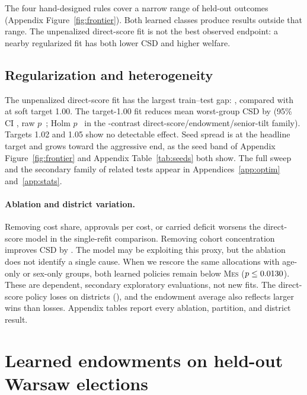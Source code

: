 \documentclass{article}
\newcommand{\MES}{\textsc{Mes}}
\begin{document}
The four hand-designed rules cover a narrow range of held-out outcomes
(Appendix Figure~\ref{fig:frontier}). Both learned classes produce results
outside that range. The unpenalized direct-score fit is not the best observed
endpoint: a nearby regularized fit has both lower CSD and higher welfare.



\subsection{Regularization and heterogeneity}

The unpenalized direct-score fit has the largest train--test gap:
\LearnedCornerGap{}, compared with \LearnedHeadGap{} at soft target 1.00. The
target-1.00 fit reduces mean worst-group CSD by \SigHeadDiffAbs{} (95\% CI
\SigHeadCI, raw $p$~\SigHeadP; Holm $p$~\SigHeadHolmP{} in the
\WarsawHolmFamilyN{}-contrast direct-score/endowment/senior-tilt family).
Targets 1.02 and 1.05 show no detectable effect.
Seed spread is \SeedSpread{} at the headline target and grows toward the
aggressive end, as the seed band of Appendix Figure~\ref{fig:frontier} and
Appendix Table~\ref{tab:seeds} both show. The
full sweep and the secondary family of related tests appear in
Appendices~\ref{app:optim} and~\ref{app:stats}.

\paragraph{Ablation and district variation.}
\label{sec:ablation}
Removing cost share, approvals per cost, or carried deficit worsens the
direct-score model in the single-refit comparison. Removing cohort
concentration improves CSD by \AblConcDeltaAbs{}. The model may be exploiting
this proxy, but the ablation does not identify a single cause. When we rescore the same allocations
with age-only or sex-only groups, both learned policies remain below \MES{}
($p\le0.0130$). These are dependent, secondary exploratory
evaluations, not new fits. The
direct-score policy loses on \PerSeriesLosses{} districts (\LossSeriesList), and
the endowment average also reflects larger wins than losses. Appendix tables
report every ablation, partition, and district result.

\section{Learned endowments on held-out Warsaw elections}
\label{sec:endowment}
\end{document}
